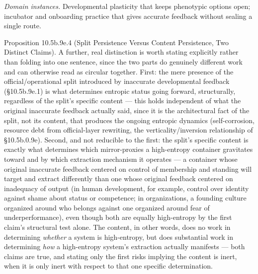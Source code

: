 \documentclass[
]{article}
\begin{document}
\emph{Domain instances.} Developmental plasticity that keeps phenotypic
options open; incubator and onboarding practice that gives accurate
feedback without sealing a single route.

Proposition 10.5b.9e.4 (Split Persistence Versus Content Persistence,
Two Distinct Claims). A further, real distinction is worth stating
explicitly rather than folding into one sentence, since the two parts do
genuinely different work and can otherwise read as circular together.
First: the mere presence of the official/operational split introduced by
inaccurate developmental feedback (§10.5b.9e.1) is what determines
entropic status going forward, structurally, regardless of the split's
specific content --- this holds independent of what the original
inaccurate feedback actually said, since it is the architectural fact of
the split, not its content, that produces the ongoing entropic dynamics
(self-corrosion, resource debt from official-layer rewriting, the
verticality/inversion relationship of §10.5b.0.9e). Second, and not
reducible to the first: the split's specific content is exactly what
determines which mirror-proxies a high-entropy container gravitates
toward and by which extraction mechanism it operates --- a container
whose original inaccurate feedback centered on control of membership and
standing will target and extract differently than one whose original
feedback centered on inadequacy of output (in human development, for
example, control over identity against shame about status or competence;
in organizations, a founding culture organized around who belongs
against one organized around fear of underperformance), even though both
are equally high-entropy by the first claim's structural test alone. The
content, in other words, does no work in determining \emph{whether} a
system is high-entropy, but does substantial work in determining
\emph{how} a high-entropy system's extraction actually manifests ---
both claims are true, and stating only the first risks implying the
content is inert, when it is only inert with respect to that one
specific determination.
\end{document}

